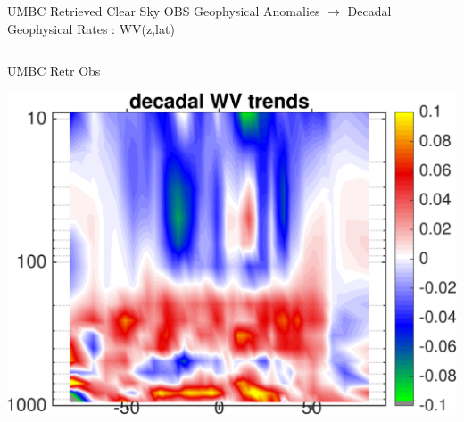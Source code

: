 \documentclass[10pt,t]{beamer}
\begin{document}
\begin{frame}{UMBC Retrieved Clear Sky OBS Geophysical Anomalies $\rightarrow$ Decadal Geophysical Rates : WV(z,lat)}
\begin{columns}
\begin{column}{0.45\columnwidth}
\begin{block}{\footnotesize UMBC Retr Obs}
\vspace{-0.1in}
\begin{center}
\includegraphics[width=\linewidth]{Figs/ClearAnom/umbc_clr_retr_obs_ptemp_rate_200209_201808.png}
\end{center}
\end{block}
\end{column}


\end{columns}
\end{frame}
\end{document}
